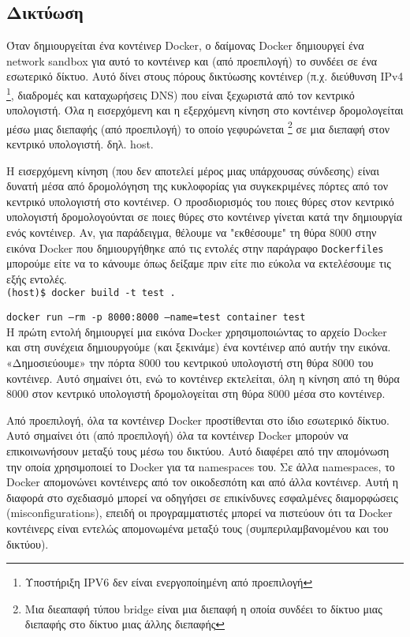 \subsection{Δικτύωση}

Όταν δημιουργείται ένα κοντέινερ \textlatin{Docker}, ο δαίμονας
\textlatin{Docker} δημιουργεί ένα \textlatin{network sandbox} για αυτό το
κοντέινερ και (από προεπιλογή) το συνδέει σε ένα εσωτερικό δίκτυο. Αυτό δίνει
στους πόρους δικτύωσης κοντέινερ (π.χ. διεύθυνση \textlatin{IPv4}
\footnote{Υποστήριξη \textlatin{IPV6} δεν είναι ενεργοποίημένη από προεπιλογή},
διαδρομές και καταχωρήσεις \textlatin{DNS}) που είναι ξεχωριστά από τον
κεντρικό υπολογιστή. Όλα η εισερχόμενη και η εξερχόμενη κίνηση στο κοντέινερ
δρομολογείται μέσω μιας διεπαφής (από προεπιλογή) το οποίο γεφυρώνεται 
\footnote{Μια διεαπαφή τύπου \textlatin{bridge} είναι μια διεπαφή η οποία
συνδέει το δίκτυο μιας διεπαφής στο δίκτυο μιας άλλης διεπαφής} 
σε μια διεπαφή στον κεντρικό υπολογιστή. δηλ. \textlatin{host}.

Η εισερχόμενη κίνηση (που δεν αποτελεί μέρος μιας υπάρχουσας σύνδεσης) είναι
δυνατή μέσα από δρομολόγηση της κυκλοφορίας για συγκεκριμένες πόρτες από τον
κεντρικό υπολογιστή στο κοντέινερ. Ο προσδιορισμός του ποιες θύρες στον κεντρικό
υπολογιστή δρομολογούνται σε ποιες θύρες στο κοντέινερ γίνεται κατά την 
δημιουργία ενός κοντέινερ. Αν, για παράδειγμα, θέλουμε να "εκθέσουμε" τη θύρα
8000 στην εικόνα \textlatin{Docker} που δημιουργήθηκε από τις εντολές στην
παράγραφο \texttt{\textlatin{Dockerfiles}} μπορούμε είτε να το κάνουμε όπως
δείξαμε πριν είτε πιο εύκολα να εκτελέσουμε τις εξής εντολές. \\

\texttt{\textlatin{(host)\$ docker build -t test .}}

\texttt{\textlatin{docker run --rm -p 8000:8000 --name=test container test}} \\


Η πρώτη εντολή δημιουργεί μια εικόνα \textlatin{Docker} χρησιμοποιώντας το
αρχείο \textlatin{Docker} και στη συνέχεια δημιουργούμε (και ξεκινάμε) ένα
κοντέινερ από αυτήν την εικόνα. «Δημοσιεύουμε» την πόρτα
8000 του κεντρικού υπολογιστή στη θύρα 8000 του κοντέινερ. Αυτό σημαίνει ότι,
ενώ το κοντέινερ εκτελείται, όλη η κίνηση από τη θύρα 8000 στον κεντρικό
υπολογιστή δρομολογείται στη θύρα 8000 μέσα στο κοντέινερ.

Από προεπιλογή, όλα τα κοντέινερ \textlatin{Docker} προστίθενται στο ίδιο
εσωτερικό δίκτυο. Αυτό σημαίνει ότι (από προεπιλογή) όλα τα κοντέινερ
\textlatin{Docker} μπορούν να επικοινωνήσουν μεταξύ τους μέσω του δικτύου.
Αυτό διαφέρει από την απομόνωση την οποία χρησιμοποιεί το \textlatin{Docker}
για τα \textlatin{namespaces} του. Σε άλλα \textlatin{namespaces}, το
\textlatin{Docker} απομονώνει κοντέινερς από τον οικοδεσπότη και από άλλα
κοντέινερ. Αυτή η διαφορά στο σχεδιασμό μπορεί να οδηγήσει σε επικίνδυνες
εσφαλμένες διαμορφώσεις (\textlatin{misconfigurations}), επειδή οι
προγραμματιστές μπορεί να πιστεύουν ότι τα \textlatin{Docker} κοντέινερς
είναι εντελώς απομονωμένα μεταξύ τους (συμπεριλαμβανομένου και του δικτύου).

